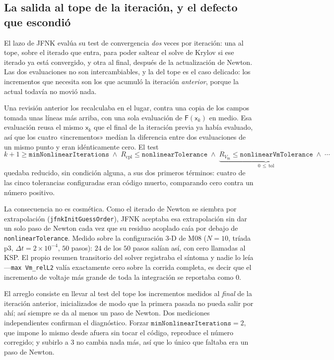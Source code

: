 \documentclass[11pt,a4paper]{article}
\newcommand{\code}[1]{\texttt{\small #1}}
\newcommand{\Vm}{V_{\text{m}}}
\newcommand{\Fres}{\mathsf{F}}
\begin{document}
\subsection{La salida al tope de la iteración, y el defecto que escondió}
\label{sec:jfnk-salida-temprana}

El lazo de JFNK evalúa su test de convergencia \emph{dos} veces por iteración: una al tope, sobre el iterado que entra, para poder saltear el solve de Krylov si ese iterado ya está convergido, y otra al final, después de la actualización de Newton. Las dos evaluaciones no son intercambiables, y la del tope es el caso delicado: los incrementos que necesita son los que acumuló la iteración \emph{anterior}, porque la actual todavía no movió nada.

Una revisión anterior los recalculaba en el lugar, contra una copia de los campos tomada unas líneas más arriba, con una sola evaluación de $\Fres(\mathsf{x}_k)$ en medio. Esa evaluación reusa el mismo $\mathsf{x}_k$ que el final de la iteración previa ya había evaluado, así que los cuatro «incrementos» medían la diferencia entre dos evaluaciones de un mismo punto y eran idénticamente cero. El test
\begin{equation*}
  k+1\ge\texttt{minNonlinearIterations}
  \;\wedge\;
  R_{\mathrm{cpl}}\le\texttt{nonlinearTolerance}
  \;\wedge\;
  \underbrace{R_{\Vm}\le\texttt{nonlinearVmTolerance}}_{0\,\le\,\text{tol}}
  \;\wedge\;\cdots
\end{equation*}
quedaba reducido, sin condición alguna, a sus dos primeros términos: cuatro de las cinco tolerancias configuradas eran código muerto, comparando cero contra un número positivo.

La consecuencia no es cosmética. Como el iterado de Newton se siembra por extrapolación (\code{jfnkInitGuessOrder}), JFNK aceptaba esa extrapolación sin dar un solo paso de Newton cada vez que su residuo acoplado caía por debajo de \code{nonlinearTolerance}. Medido sobre la configuración 3-D de M08 ($N=10$, tríada $\mathrm{p}3$, $\Delta t=2\times10^{-4}$, $50$ pasos): $24$ de los $50$ pasos salían así, con cero llamadas al KSP. El propio resumen transitorio del solver registraba el síntoma y nadie lo leía —\code{max Vm\_relL2} valía exactamente cero sobre la corrida completa, es decir que el incremento de voltaje más grande de toda la integración se reportaba como $0$.

El arreglo consiste en llevar al test del tope los incrementos medidos al \emph{final} de la iteración anterior, inicializados de modo que la primera pasada no pueda salir por ahí; así siempre se da al menos un paso de Newton. Dos mediciones independientes confirman el diagnóstico. Forzar $\texttt{minNonlinearIterations}=2$, que impone lo mismo desde afuera sin tocar el código, reproduce el número corregido; y subirlo a $3$ no cambia nada más, así que lo único que faltaba era un paso de Newton.
\end{document}
